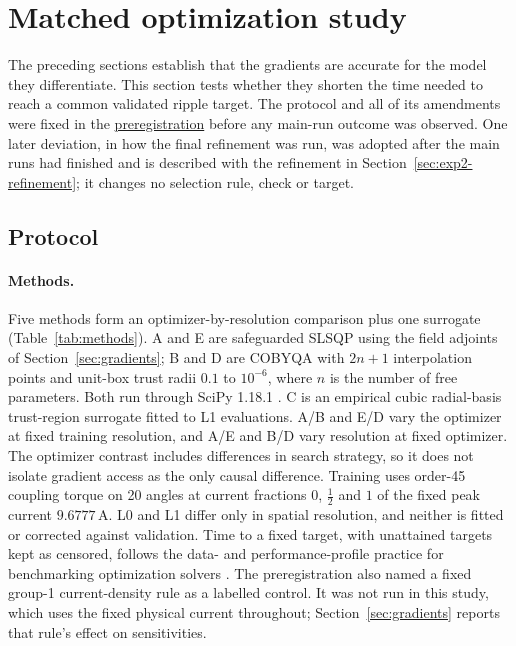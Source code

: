 \section{Matched optimization study}\label{sec:optimization}
The preceding sections establish that the gradients are accurate for the
model they differentiate. This section tests whether they shorten the time
needed to reach a common validated ripple target. The protocol and all of
its amendments were fixed in the
\href{https://github.com/rjwalters/geode-fem/issues/1185}{preregistration}
before any main-run outcome was observed. One later deviation, in how the
final refinement was run, was adopted after the main runs had finished and
is described with the refinement in Section~\ref{sec:exp2-refinement}; it
changes no selection rule, check or target.

\subsection{Protocol}
\paragraph{Methods.}
Five methods form an optimizer-by-resolution comparison plus one
surrogate (Table~\ref{tab:methods}). A and E are safeguarded SLSQP
\citep{kraft1988} using the field adjoints of Section~\ref{sec:gradients};
B and D are COBYQA \citep{ragonneau2022} with $2n+1$ interpolation points
and unit-box trust radii $0.1$ to $10^{-6}$, where $n$ is the number of free
parameters. Both run through SciPy 1.18.1 \citep{virtanen2020scipy}. C is
an empirical cubic radial-basis trust-region surrogate fitted to L1
evaluations. A/B and E/D vary the optimizer at fixed training resolution,
and A/E and B/D vary resolution at fixed optimizer. The optimizer contrast
includes differences in search strategy, so it does not isolate gradient
access as the only causal difference. Training uses order-45 coupling torque
on 20 angles at current fractions $0$, $\tfrac12$ and $1$ of the fixed peak
current $9.6777\,\mathrm{A}$. L0 and L1 differ only in spatial resolution,
and neither is fitted or corrected against validation. Time to a fixed
target, with unattained targets kept as censored, follows the data- and performance-profile
practice for benchmarking optimization solvers \citep{more2009benchmarking,dolan2002benchmarking}.
The preregistration also named a fixed group-1 current-density rule as a
labelled control. It was not run in this study, which uses the fixed
physical current throughout; Section~\ref{sec:gradients} reports that
rule's effect on sensitivities.

